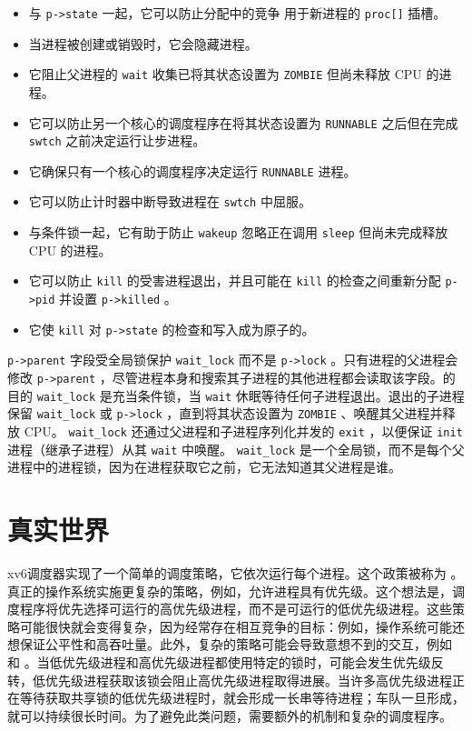    \begin{itemize}


   \item   与    \lstinline{p->state}    一起，它可以防止分配中的竞争
 用于新进程的    \lstinline{proc[]}    插槽。   \item   当进程被创建或销毁时，它会隐藏进程。   \item   它阻止父进程的    \lstinline{wait}    收集已将其状态设置为    \lstinline{ZOMBIE}    但尚未释放 CPU 的进程。   \item   它可以防止另一个核心的调度程序在将其状态设置为    \lstinline{RUNNABLE}    之后但在完成    \lstinline{swtch}    之前决定运行让步进程。   \item   它确保只有一个核心的调度程序决定运行
    \lstinline{RUNNABLE}    进程。   \item   它可以防止计时器中断导致进程在    \lstinline{swtch}    中屈服。   \item   与条件锁一起，它有助于防止    \lstinline{wakeup}    忽略正在调用    \lstinline{sleep}    但尚未完成释放 CPU 的进程。   \item   它可以防止    \lstinline{kill}    的受害进程退出，并且可能在    \lstinline{kill}    的检查之间重新分配
    \lstinline{p->pid}    并设置    \lstinline{p->killed}    。   \item   它使    \lstinline{kill}    对    \lstinline{p->state}    的检查和写入成为原子的。  \end{itemize}     

   \lstinline{p->parent}    字段受全局锁保护
    \lstinline{wait_lock}    而不是    \lstinline{p->lock}    。只有进程的父进程会修改    \lstinline{p->parent}    ，尽管进程本身和搜索其子进程的其他进程都会读取该字段。的目的
    \lstinline{wait_lock}    是充当条件锁，当
    \lstinline{wait}    休眠等待任何子进程退出。退出的子进程保留    \lstinline{wait_lock}    或    \lstinline{p->lock}    ，直到将其状态设置为    \lstinline{ZOMBIE}    、唤醒其父进程并释放 CPU。    \lstinline{wait_lock}    还通过父进程和子进程序列化并发的    \lstinline{exit}    ，以便保证    \lstinline{init}    进程（继承子进程）从其    \lstinline{wait}    中唤醒。
    \lstinline{wait_lock}    是一个全局锁，而不是每个父进程中的进程锁，因为在进程获取它之前，它无法知道其父进程是谁。
    \section{真实世界  }     

xv6调度器实现了一个简单的调度策略，它依次运行每个进程。这个政策被称为
        。真正的操作系统实施更复杂的策略，例如，允许进程具有优先级。这个想法是，调度程序将优先选择可运行的高优先级进程，而不是可运行的低优先级进程。这些策略可能很快就会变得复杂，因为经常存在相互竞争的目标：例如，操作系统可能还想保证公平性和高吞吐量。此外，复杂的策略可能会导致意想不到的交互，例如
        和
        。当低优先级进程和高优先级进程都使用特定的锁时，可能会发生优先级反转，低优先级进程获取该锁会阻止高优先级进程取得进展。当许多高优先级进程正在等待获取共享锁的低优先级进程时，就会形成一长串等待进程；车队一旦形成，就可以持续很长时间。为了避免此类问题，需要额外的机制和复杂的调度程序。  

